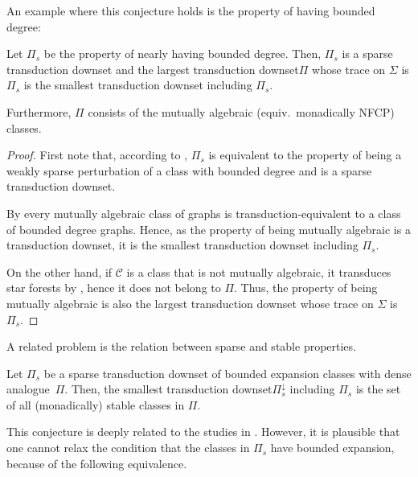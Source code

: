 \documentclass{lmcs}
\newcommand{\Cc}{\mathscr{C}}
\theoremstyle{definition}
\newcommand{\dset}{downset\xspace}
\begin{document}
An example where this conjecture holds is  the property of having bounded degree:

\begin{prop}
	Let $\Pi_s$ be the property of nearly having bounded degree.
	Then, $\Pi_s$ is a sparse transduction \dset and  the largest  transduction \dset $\Pi$ whose trace on $\Sigma$ is  $\Pi_s$ is the smallest transduction \dset including $\Pi_s$.
	
	Furthermore, $\Pi$ consists of the mutually algebraic (equiv.\ monadically NFCP) classes.
\end{prop}
\begin{proof}
	First note that, according to , $\Pi_s$ is equivalent to the property of being a weakly sparse perturbation of a class with bounded degree and is a sparse transduction \dset.
	
	By  every mutually algebraic class of graphs is transduction-equivalent to a class of bounded degree graphs. Hence, as the property of being mutually algebraic is a transduction \dset, it is the smallest transduction \dset including $\Pi_s$.
	
	On the other hand, if $\Cc$ is a class that is not mutually algebraic, it  transduces star forests by , hence it does not belong to $\Pi$. Thus, the property of being mutually algebraic is also the largest 
	transduction \dset whose trace on $\Sigma$ is  $\Pi_s$.
\end{proof}


A related problem is the relation between sparse and stable properties.

\begin{conj}
	\label{conj:stable}
	Let $\Pi_s$ be a sparse transduction \dset of bounded expansion classes with dense analogue~$\Pi$.
	Then,  the smallest transduction \dset $\Pi_s^{\downarrow}$ including $\Pi_s$  is the set of all  (monadically) stable classes in $\Pi$.
\end{conj}

This conjecture is deeply related to the studies in  \cite{SODA_msrw,nevsetril2020rankwidth,gajarsky2022stable}.
However, it is plausible that one cannot relax the condition that the classes in $\Pi_s$ have bounded expansion, because of the following equivalence.
\end{document}
